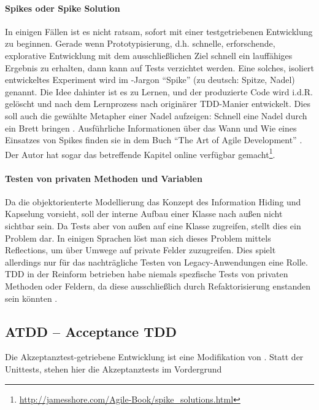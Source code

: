   \paragraph{Spikes oder Spike Solution} In einigen Fällen ist es nicht ratsam, sofort mit einer testgetriebenen Entwicklung zu beginnen. Gerade wenn Prototypisierung, d.h. schnelle, erforschende, explorative Entwicklung mit dem ausschließlichen Ziel schnell ein lauffähiges Ergebnis zu erhalten, dann kann auf Tests verzichtet werden. Eine solches, isoliert entwickeltes Experiment wird im -Jargon "`Spike"' (zu deutsch: Spitze, Nadel) genannt. Die Idee dahinter ist es zu Lernen, und der produzierte Code wird i.d.R. gelöscht und nach dem Lernprozess nach originärer TDD-Manier entwickelt. Dies soll auch die gewählte Metapher einer Nadel aufzeigen: Schnell eine Nadel durch ein Brett bringen \citep{shore_art_2007}. Ausführliche Informationen über das Wann und Wie eines Einsatzes von Spikes finden sie in dem Buch "`The Art of Agile Development"' \citep{shore_art_2007}. Der Autor hat sogar das betreffende Kapitel online verfügbar gemacht\footnote{\url{http://jamesshore.com/Agile-Book/spike_solutions.html}}.

  \paragraph{Testen von privaten Methoden und Variablen} Da die objektorienterte Modellierung das Konzept des Information Hiding und Kapselung vorsieht, soll der interne Aufbau einer Klasse nach außen nicht sichtbar sein. Da Tests aber von außen auf eine Klasse zugreifen, stellt dies ein Problem dar. In einigen Sprachen löst man sich dieses Problem mittels Reflections, um über Umwege auf private Felder zuzugreifen. Dies spielt allerdings nur für das nachträgliche Testen von Legacy-Anwendungen eine Rolle. TDD in der Reinform betrieben habe niemals spezfische Tests von privaten Methoden oder Feldern, da diese ausschließlich durch Refaktorisierung enstanden sein könnten \citep{caroli_agile_2008}.
 
  
  
  
  \subsection{ATDD -- Acceptance TDD}
  \label{sec:attd}
  Die Akzeptanztest-getriebene Entwicklung ist eine Modifikation von . Statt der Unittests, stehen hier die Akzeptanztests im Vordergrund
  
